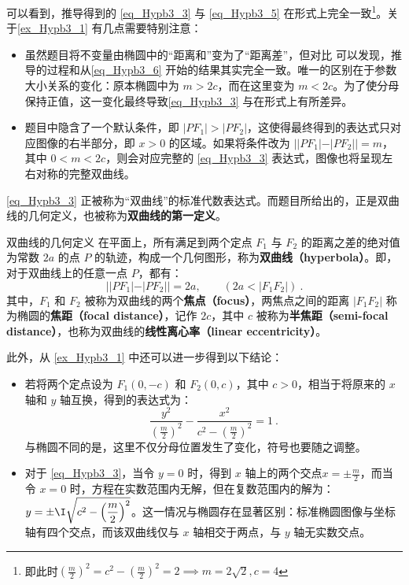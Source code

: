 可以看到，推导得到的 \autoref{eq_Hypb3_3} 与 \autoref{eq_Hypb3_5} 在形式上完全一致\footnote{即此时$\left(\displaystyle\frac{m}{2}\right)^2=\displaystyle c^2-\left(\frac{m}{2}\right)^2=2\implies m=2\sqrt{2},c=4$}。关于\autoref{ex_Hypb3_1} 有几点需要特别注意：
\begin{itemize}
\item 虽然题目将不变量由椭圆中的“距离和”变为了“距离差”，但对比  可以发现，推导的过程和从\autoref{eq_Hypb3_6} 开始的结果其实完全一致。唯一的区别在于参数大小关系的变化：原本椭圆中为 $m > 2c$，而在这里变为 $m < 2c$。为了使分母保持正值，这一变化最终导致\autoref{eq_Hypb3_3} 与在形式上有所差异。
\item 题目中隐含了一个默认条件，即 $|PF_1| > |PF_2|$，这使得最终得到的表达式只对应图像的右半部分，即 $x > 0$ 的区域。如果将条件改为 $||PF_1| - |PF_2|| = m$，其中 $0 < m < 2c$，则会对应完整的 \autoref{eq_Hypb3_3} 表达式，图像也将呈现左右对称的完整双曲线。
\end{itemize}

 \autoref{eq_Hypb3_3} 正被称为“双曲线”的标准代数表达式。而题目所给出的，正是双曲线的几何定义，也被称为\textbf{双曲线的第一定义}。

\begin{definition}{双曲线的几何定义}
在平面上，所有满足到两个定点 $F_1$ 与 $F_2$ 的距离之差的绝对值为常数 $2a$ 的点 $P$ 的轨迹，构成一个几何图形，称为\textbf{双曲线（hyperbola）}。即，对于双曲线上的任意一点 $P$，都有：
\begin{equation}
||PF_1| - |PF_2|| = 2a ,\qquad(2a<|F_1F_2|)~.
\end{equation}
其中，$F_1$ 和 $F_2$ 被称为双曲线的两个\textbf{焦点（focus）}，两焦点之间的距离 $|F_1F_2|$ 称为椭圆的\textbf{焦距（focal distance）}，记作 $2c$，其中 $c$ 被称为\textbf{半焦距（semi-focal distance）}，也称为双曲线的\textbf{线性离心率（linear eccentricity）}。
\end{definition}

此外，从 \autoref{ex_Hypb3_1} 中还可以进一步得到以下结论：

\begin{itemize}
\item 若将两个定点设为 $F_1(0,-c)$ 和 $F_2(0,c)$，其中 $c > 0$，相当于将原来的 $x$ 轴和 $y$ 轴互换，得到的表达式为：
\begin{equation}\label{eq_Hypb3_7}
\frac{y^2}{\left(\displaystyle\frac{m}{2}\right)^2}-\frac{x^2}{\displaystyle c^2-\left(\frac{m}{2}\right)^2} =1~.
\end{equation}
与椭圆不同的是，这里不仅分母位置发生了变化，符号也要随之调整。
\item 对于 \autoref{eq_Hypb3_3}，当令 $y = 0$ 时，得到 $x$ 轴上的两个交点$\displaystyle x = \pm \frac{m}{2}$，而当令 $x = 0$ 时，方程在实数范围内无解，但在复数范围内的解为：$y = \displaystyle\pm \I \sqrt{c^2 - \left( \frac{m}{2} \right)^2}$。这一情况与椭圆存在显著区别：标准椭圆图像与坐标轴有四个交点，而该双曲线仅与 $x$ 轴相交于两点，与 $y$ 轴无实数交点。
\end{itemize}


